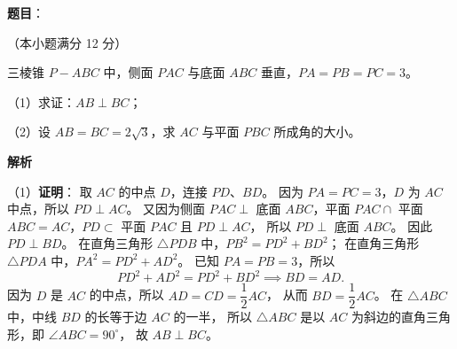\begin{answer}

\textbf{题目}：

（本小题满分 12 分）

三棱锥 $P-ABC$ 中，侧面 $PAC$ 与底面 $ABC$ 垂直，$PA=PB=PC=3$。
\nopagebreak[4]
\begin{center}\end{center}
\nopagebreak[4]
（1）求证：$AB\perp BC$；

（2）设 $AB=BC=2\sqrt{3}$，求 $AC$ 与平面 $PBC$ 所成角的大小。

\textbf{解析}

（1）\textbf{证明}：
取 $AC$ 的中点 $D$，连接 $PD$、$BD$。
因为 $PA=PC=3$，$D$ 为 $AC$ 中点，所以 $PD\perp AC$。
又因为侧面 $PAC\perp$ 底面 $ABC$，平面 $PAC\cap$ 平面 $ABC=AC$，$PD\subset$ 平面 $PAC$ 且 $PD\perp AC$，
所以 $PD\perp$ 底面 $ABC$。
因此 $PD\perp BD$。
在直角三角形 $\triangle PDB$ 中，$PB^2=PD^2+BD^2$；
在直角三角形 $\triangle PDA$ 中，$PA^2=PD^2+AD^2$。
已知 $PA=PB=3$，所以
\nopagebreak[4]
\[
PD^2+AD^2=PD^2+BD^2 \implies BD=AD.
\]
因为 $D$ 是 $AC$ 的中点，所以 $AD=CD=\dfrac{1}{2}AC$，
从而 $BD=\dfrac{1}{2}AC$。
在 $\triangle ABC$ 中，中线 $BD$ 的长等于边 $AC$ 的一半，
所以 $\triangle ABC$ 是以 $AC$ 为斜边的直角三角形，即 $\angle ABC=90^\circ$，
故 $AB\perp BC$。


\end{answer}
